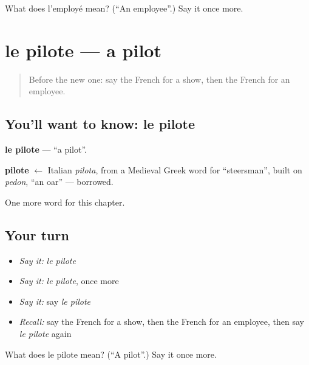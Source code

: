 \begin{tcolorbox}[breakable,colback=teal!4,colframe=teal!35!black,title={Before you move on}]
What does l'employé mean? (\textquotedblleft{}An employee\textquotedblright{}.) Say it once more.
\end{tcolorbox}
\section[le pilote]{le pilote — a pilot}

\label{lesson:FR-C224-pilote}



\begin{quote}
Before the new one: say the French for a show, then the French for an employee.
\end{quote}

\subsection*{You'll want to know: le pilote}
\textbf{le pilote} — \textquotedblleft{}a pilot\textquotedblright{}.

\begin{cousinweb}
\textbf{pilote} $\leftarrow$ Italian \emph{pilota}, from a Medieval Greek word for \textquotedblleft{}steersman\textquotedblright{}, built on \emph{pedon}, \textquotedblleft{}an oar\textquotedblright{} — borrowed.
\end{cousinweb}

\begin{grammarlens}[title={What you've built}]
One more word for this chapter.
\end{grammarlens}

\subsection*{Your turn}
\begin{itemize}
\raggedright
  \item \emph{Say it:} \emph{le pilote}
  \item \emph{Say it:} \emph{le pilote}, once more
  \item \emph{Say it:} say \emph{le pilote}
  \item \emph{Recall:} say the French for a show, then the French for an employee, then say \emph{le pilote} again
\end{itemize}

\begin{tcolorbox}[breakable,colback=teal!4,colframe=teal!35!black,title={Before you move on}]
What does le pilote mean? (\textquotedblleft{}A pilot\textquotedblright{}.) Say it once more.
\end{tcolorbox}
